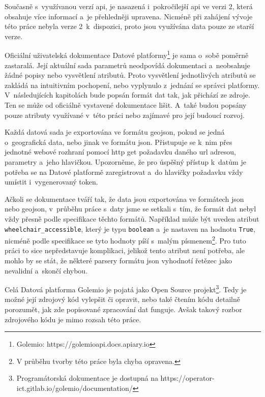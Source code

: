 \bigbreak

Současně s~využívanou verzí \gls{api}, je nasazená i~pokročilejší \gls{api} ve verzi 2, která obsahuje více informací a~je přehledněji upravena. Nicméně při zahájení vývoje této práce nebyla verze 2~k~dispozici, proto jsou využívána data pouze ze starší verze.

\bigbreak

Oficiální uživatelská dokumentace Datové platformy\footnote{Golemio: https://golemioapi.docs.apiary.io} je sama o~sobě poměrně zastaralá. Její aktuální sada parametrů neodpovídá dokumentaci a~neobsahuje žádné popisy nebo vysvětlení atributů. Proto vysvětlení jednotlivých atributů se zakládá na intuitivním pochopení, nebo vyplynulo z~jednání se správci platformy. V~následujících kapitolách bude popsán formát dat tak, jak přichází ze zdroje. Ten se může od oficiálně vystavené dokumentace lišit. A~také budou popsány pouze atributy využívané v~této práci nebo zajímavé pro její budoucí rozvoj.

\bigbreak

Každá datová sada je exportována ve formátu \gls{geojson}, pokud se jedná o~geografická data, nebo jinak ve formátu \gls{json}. Přistupuje se k~nim přes jednotné webové rozhraní pomocí \gls{http} get požadavku daného \gls{url} adresou, parametry a~jeho hlavičkou. Upozorněme, že pro úspěšný přístup k~datům je potřeba se na Datové platformě zaregistrovat a~do hlavičky požadavku vždy umístit i~vygenerovaný token.

\bigbreak

Ačkoli se dokumentace tváří tak, že data jsou exportována ve formátech \gls{json} nebo \gls{geojson}, v~průběhu práce s~daty jsme se setkali s~tím, že formát dat nebyl vždy přesně podle specifikace těchto formátů. Například může být uveden atribut \verb"wheelchair_accessible", který je typu \verb"boolean" a~je nastaven na hodnotu \verb"True", nicméně podle specifikace se tyto hodnoty píší s~malým písmenem\footnote{V průběhu tvorby této práce byla chyba opravena.}. Pro tuto práci to sice nepředstavuje komplikaci, jelikož tento atribut není potřeba, ale mohlo by se stát, že některé parsery formátu \gls{json} vyhodnotí řetězec jako nevalidní a~skončí chybou.

\bigbreak

Celá Datová platforma Golemio je pojatá jako Open Source projekt\footnote{Programátorská dokumentace je dostupná na https://operator-ict.gitlab.io/golemio/documentation/}. Tedy je možné její zdrojový kód vylepšit či opravit, nebo také čtením kódu detailně porozumět, jak zde popisované zpracování dat funguje. Avšak takový rozbor zdrojového kódu je mimo rozsah této práce.

